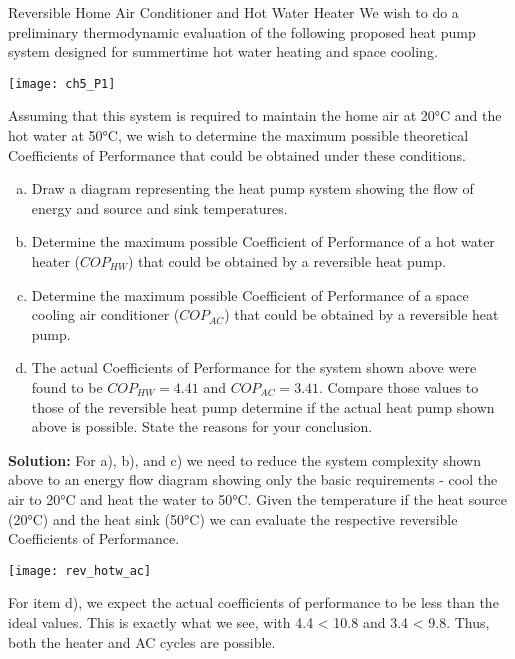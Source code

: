 \begin{example}{Reversible Home Air Conditioner and Hot Water Heater}
  We wish to do a preliminary thermodynamic evaluation of the following proposed heat pump system designed for summertime hot water heating and space cooling.
  \begin{center}
    \texttt{[image: ch5\_P1]}
  \end{center}

  Assuming that this system is required to maintain the home air at 20°C and the hot water at 50°C, we wish to determine the maximum possible theoretical Coefficients of Performance that could be obtained under these conditions.

  \begin{enumerate}[a)]
  \item Draw a diagram representing the heat pump system showing the flow of energy and source and sink temperatures.
  \item Determine the maximum possible Coefficient of Performance of a hot water heater ($COP_{HW}$) that could be obtained by a reversible heat pump.
  \item Determine the maximum possible Coefficient of Performance of a space cooling air conditioner ($COP_{AC}$) that could be obtained by a reversible heat pump.
  \item The actual Coefficients of Performance for the system shown above were found to be $COP_{HW} = 4.41$ and $COP_{AC} = 3.41$.  Compare those values to those of the reversible heat pump determine if the actual heat pump shown above is possible. State the reasons for your conclusion.
  \end{enumerate}
  {\bf Solution:}
  For a), b), and c) we need to reduce the system complexity shown above to an energy flow diagram showing only the basic requirements - cool the air to 20°C and heat the water to 50°C. Given the temperature if the heat source (20°C) and the heat sink (50°C) we can evaluate the respective reversible Coefficients of Performance.

  \begin{center}
    \texttt{[image: rev\_hotw\_ac]}
  \end{center}

  For item d), we expect the actual coefficients of performance to be less than the ideal values.  This is exactly what we see, with 4.4 < 10.8 and 3.4 < 9.8.  Thus, both the heater and AC cycles are possible.


\end{example}
